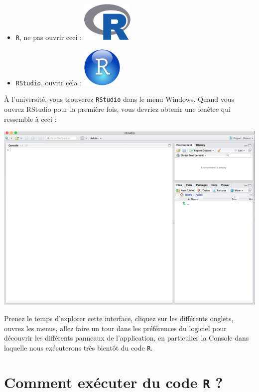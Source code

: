 \documentclass[
  a4paper,
  DIV=11,
  numbers=noendperiod,
  oneside]{scrreprt}
\providecommand{\tightlist}{%
  \setlength{\itemsep}{0pt}\setlength{\parskip}{0pt}}\usepackage{longtable,booktabs,array}
\begin{document}
\begin{itemize}
\tightlist
\item
  \texttt{R}, ne pas ouvrir ceci : \includegraphics{images/Rlogo.png}
\item
  \texttt{RStudio}, ouvrir cela :
  \includegraphics{images/RStudio-Ball.png}
\end{itemize}

À l'université, vous trouverez \texttt{RStudio} dans le menu Windows.
Quand vous ouvrez RStudio pour la première fois, vous devriez obtenir
une fenêtre qui ressemble à ceci :

\includegraphics{images/rstudio.png}

Prenez le temps d'explorer cette interface, cliquez sur les différents
onglets, ouvrez les menus, allez faire un tour dans les préférences du
logiciel pour découvrir les différents panneaux de l'application, en
particulier la Console dans laquelle nous exécuterons très bientôt du
code \texttt{R}.

\section{\texorpdfstring{Comment exécuter du code \texttt{R}
?}{Comment exécuter du code R ?}}\label{sec-code}
\end{document}
